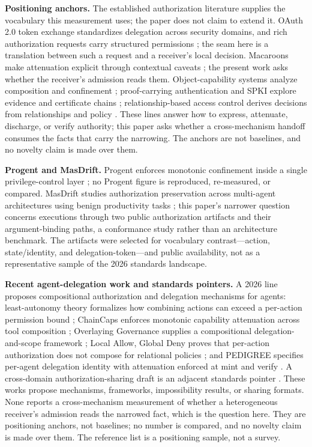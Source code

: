 \documentclass[sigconf,anonymous,nonacm]{acmart}
\begin{document}
\textbf{Positioning anchors.} The established authorization literature supplies the vocabulary this measurement uses; the paper does not claim to extend it. OAuth 2.0 token exchange standardizes delegation across security domains, and rich authorization requests carry structured permissions \cite{rfc8693,rfc9396}; the seam here is a translation between such a request and a receiver's local decision. Macaroons make attenuation explicit through contextual caveats \cite{macaroons}; the present work asks whether the receiver's admission reads them. Object-capability systems analyze composition and confinement \cite{miller,blaze}; proof-carrying authentication and SPKI explore evidence and certificate chains \cite{appel,rfc2693}; relationship-based access control derives decisions from relationships and policy \cite{fong}. These lines answer how to express, attenuate, discharge, or verify authority; this paper asks whether a cross-mechanism handoff consumes the facts that carry the narrowing. The anchors are not baselines, and no novelty claim is made over them.

\textbf{Progent and MasDrift.} Progent enforces monotonic confinement inside a single privilege-control layer \cite{progent}; no Progent figure is reproduced, re-measured, or compared. MasDrift studies authorization preservation across multi-agent architectures using benign productivity tasks \cite{masdrift}; this paper's narrower question concerns executions through two public authorization artifacts and their argument-binding paths, a conformance study rather than an architecture benchmark. The artifacts were selected for vocabulary contrast---action, state/identity, and delegation-token---and public availability, not as a representative sample of the 2026 standards landscape.

\textbf{Recent agent-delegation work and standards pointers.} A 2026 line proposes compositional authorization and delegation mechanisms for agents: least-autonomy theory formalizes how combining actions can exceed a per-action permission bound \cite{leastautonomy}; ChainCaps enforces monotonic capability attenuation across tool composition \cite{chaincaps}; Overlaying Governance supplies a compositional delegation-and-scope framework \cite{overlaying}; Local Allow, Global Deny proves that per-action authorization does not compose for relational policies \cite{localallow}; and PEDIGREE specifies per-agent delegation identity with attenuation enforced at mint and verify \cite{pedigree}. A cross-domain authorization-sharing draft is an adjacent standards pointer \cite{ietf}. These works propose mechanisms, frameworks, impossibility results, or sharing formats. None reports a cross-mechanism measurement of whether a heterogeneous receiver's admission reads the narrowed fact, which is the question here. They are positioning anchors, not baselines; no number is compared, and no novelty claim is made over them. The reference list is a positioning sample, not a survey.
\end{document}
